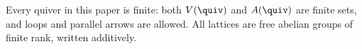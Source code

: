 \begin{convention}\label{sh-0001}
Every quiver in this paper is finite: both $V(\quiv)$ and $A(\quiv)$ are finite sets, and loops and parallel arrows are allowed. All lattices are free abelian groups of finite rank, written additively.
\end{convention}